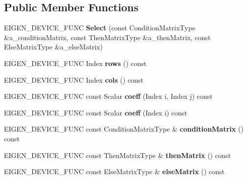 \subsection*{Public Member Functions}
\begin{DoxyCompactItemize}
\item 
\mbox{\label{class_eigen_1_1_select_ad328fe4025aa96f75274f6b4fab30c11}} 
E\+I\+G\+E\+N\+\_\+\+D\+E\+V\+I\+C\+E\+\_\+\+F\+U\+NC {\bfseries Select} (const Condition\+Matrix\+Type \&a\+\_\+condition\+Matrix, const Then\+Matrix\+Type \&a\+\_\+then\+Matrix, const Else\+Matrix\+Type \&a\+\_\+else\+Matrix)
\item 
\mbox{\label{class_eigen_1_1_select_a8a1769dfa37f2fd7e8fe595017aa4812}} 
E\+I\+G\+E\+N\+\_\+\+D\+E\+V\+I\+C\+E\+\_\+\+F\+U\+NC Index {\bfseries rows} () const
\item 
\mbox{\label{class_eigen_1_1_select_ae359e219e28bfe6fd86ecd41f3e4be23}} 
E\+I\+G\+E\+N\+\_\+\+D\+E\+V\+I\+C\+E\+\_\+\+F\+U\+NC Index {\bfseries cols} () const
\item 
\mbox{\label{class_eigen_1_1_select_a8acf0e2997cdd7872eaf1992c0221e08}} 
E\+I\+G\+E\+N\+\_\+\+D\+E\+V\+I\+C\+E\+\_\+\+F\+U\+NC const Scalar {\bfseries coeff} (Index i, Index j) const
\item 
\mbox{\label{class_eigen_1_1_select_a9a2998ba55d690198bea605bc9b79498}} 
E\+I\+G\+E\+N\+\_\+\+D\+E\+V\+I\+C\+E\+\_\+\+F\+U\+NC const Scalar {\bfseries coeff} (Index i) const
\item 
\mbox{\label{class_eigen_1_1_select_ae07459626b9c5fb1bfb25515fedb856b}} 
E\+I\+G\+E\+N\+\_\+\+D\+E\+V\+I\+C\+E\+\_\+\+F\+U\+NC const Condition\+Matrix\+Type \& {\bfseries condition\+Matrix} () const
\item 
\mbox{\label{class_eigen_1_1_select_ac4a70edbf86921bef8c4a5f7e9741c6b}} 
E\+I\+G\+E\+N\+\_\+\+D\+E\+V\+I\+C\+E\+\_\+\+F\+U\+NC const Then\+Matrix\+Type \& {\bfseries then\+Matrix} () const
\item 
\mbox{\label{class_eigen_1_1_select_a60deb659f00257e0e856074e9263434a}} 
E\+I\+G\+E\+N\+\_\+\+D\+E\+V\+I\+C\+E\+\_\+\+F\+U\+NC const Else\+Matrix\+Type \& {\bfseries else\+Matrix} () const
\end{DoxyCompactItemize}
